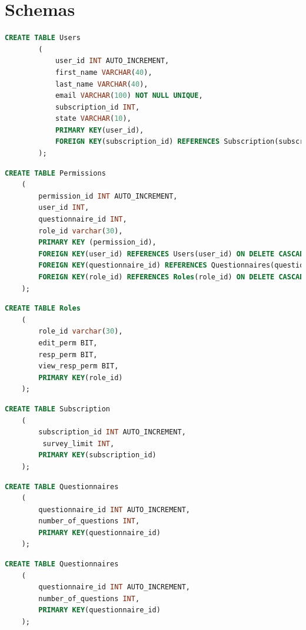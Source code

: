 \documentclass[12pt, oneside, a4paper]{article}
\begin{document}
    \section{Schemas}
    \begin{lstlisting}[language=SQL, columns=flexible, breaklines]
        CREATE TABLE Users
        (
            user_id INT AUTO_INCREMENT,
            first_name VARCHAR(40),
            last_name VARCHAR(40),
            email VARCHAR(100) NOT NULL UNIQUE,
            subscription_id INT,
            state VARCHAR(10),
            PRIMARY KEY(user_id),
            FOREIGN KEY(subscription_id) REFERENCES Subscription(subscription_id) ON DELETE CASCADE
        );
    \end{lstlisting}
    \begin{lstlisting}[language=SQL, columns=flexible, breaklines]
    CREATE TABLE Permissions
    (
        permission_id INT AUTO_INCREMENT,
        user_id INT,
        questionnaire_id INT,
        role_id varchar(30),
        PRIMARY KEY (permission_id),
        FOREIGN KEY(user_id) REFERENCES Users(user_id) ON DELETE CASCADE,
        FOREIGN KEY(questionnaire_id) REFERENCES Questionnaires(questionnaire_id) ON DELETE CASCADE,
        FOREIGN KEY(role_id) REFERENCES Roles(role_id) ON DELETE CASCADE
    );
    \end{lstlisting}
    \begin{lstlisting}[language=SQL, columns=flexible, breaklines]
    CREATE TABLE Roles
    (
        role_id varchar(30),
        edit_perm BIT,
        resp_perm BIT,
        view_resp_perm BIT,
        PRIMARY KEY(role_id)
    );
    \end{lstlisting}
    \begin{lstlisting}[language=SQL, columns=flexible, breaklines]
    CREATE TABLE Subscription
    (
        subscription_id INT AUTO_INCREMENT,
         survey_limit INT,
        PRIMARY KEY(subscription_id)
    );
    \end{lstlisting}
    \begin{lstlisting}[language=SQL, columns=flexible, breaklines]
    CREATE TABLE Questionnaires
    (
        questionnaire_id INT AUTO_INCREMENT,
        number_of_questions INT,
        PRIMARY KEY(questionnaire_id)
    );
    \end{lstlisting}
    \begin{lstlisting}[language=SQL, columns=flexible, breaklines]
    CREATE TABLE Questionnaires
    (
        questionnaire_id INT AUTO_INCREMENT,
        number_of_questions INT,
        PRIMARY KEY(questionnaire_id)
    );
    \end{lstlisting}
\end{document}
